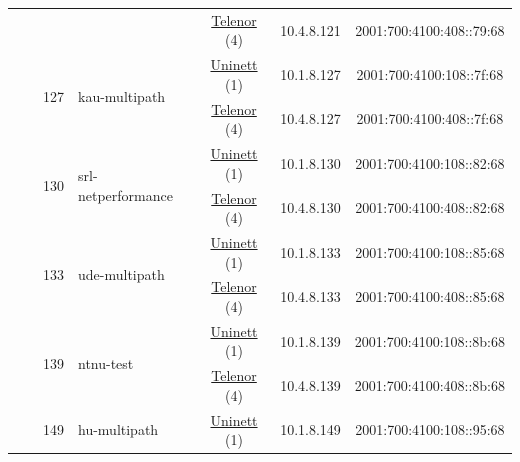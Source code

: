 \begin{small}
\begin{center}
\begin{longtable}{|c|c|c|c|c|c|c|c|}
  &  &  &  & \multicolumn{2}{|c|}{\tiny{\href{https://www.telenor.no}{Telenor} (4)}} & \tiny{10.4.8.121} & \tiny{2001:700:4100:408::79:68} \\* \cline{3-3}\cline{4-4}\cline{5-5}\cline{6-6}\cline{7-7}\cline{8-8}
  &  & \multirow{2}{*}{\tiny{127}} & \multicolumn{1}{|l|}{\multirow{2}{*}{\tiny{kau-multipath}}} & \multicolumn{2}{|c|}{\tiny{\href{https://www.uninett.no}{Uninett} (1)}} & \tiny{10.1.8.127} & \tiny{2001:700:4100:108::7f:68} \\* \cline{5-5}\cline{6-6}\cline{7-7}\cline{8-8}
  &  &  &  & \multicolumn{2}{|c|}{\tiny{\href{https://www.telenor.no}{Telenor} (4)}} & \tiny{10.4.8.127} & \tiny{2001:700:4100:408::7f:68} \\* \cline{3-3}\cline{4-4}\cline{5-5}\cline{6-6}\cline{7-7}\cline{8-8}
  &  & \multirow{2}{*}{\tiny{130}} & \multicolumn{1}{|l|}{\multirow{2}{*}{\tiny{srl-netperformance}}} & \multicolumn{2}{|c|}{\tiny{\href{https://www.uninett.no}{Uninett} (1)}} & \tiny{10.1.8.130} & \tiny{2001:700:4100:108::82:68} \\* \cline{5-5}\cline{6-6}\cline{7-7}\cline{8-8}
  &  &  &  & \multicolumn{2}{|c|}{\tiny{\href{https://www.telenor.no}{Telenor} (4)}} & \tiny{10.4.8.130} & \tiny{2001:700:4100:408::82:68} \\* \cline{3-3}\cline{4-4}\cline{5-5}\cline{6-6}\cline{7-7}\cline{8-8}
  &  & \multirow{2}{*}{\tiny{133}} & \multicolumn{1}{|l|}{\multirow{2}{*}{\tiny{ude-multipath}}} & \multicolumn{2}{|c|}{\tiny{\href{https://www.uninett.no}{Uninett} (1)}} & \tiny{10.1.8.133} & \tiny{2001:700:4100:108::85:68} \\* \cline{5-5}\cline{6-6}\cline{7-7}\cline{8-8}
  &  &  &  & \multicolumn{2}{|c|}{\tiny{\href{https://www.telenor.no}{Telenor} (4)}} & \tiny{10.4.8.133} & \tiny{2001:700:4100:408::85:68} \\* \cline{3-3}\cline{4-4}\cline{5-5}\cline{6-6}\cline{7-7}\cline{8-8}
  &  & \multirow{2}{*}{\tiny{139}} & \multicolumn{1}{|l|}{\multirow{2}{*}{\tiny{ntnu-test}}} & \multicolumn{2}{|c|}{\tiny{\href{https://www.uninett.no}{Uninett} (1)}} & \tiny{10.1.8.139} & \tiny{2001:700:4100:108::8b:68} \\* \cline{5-5}\cline{6-6}\cline{7-7}\cline{8-8}
  &  &  &  & \multicolumn{2}{|c|}{\tiny{\href{https://www.telenor.no}{Telenor} (4)}} & \tiny{10.4.8.139} & \tiny{2001:700:4100:408::8b:68} \\* \cline{3-3}\cline{4-4}\cline{5-5}\cline{6-6}\cline{7-7}\cline{8-8}
  &  & \multirow{2}{*}{\tiny{149}} & \multicolumn{1}{|l|}{\multirow{2}{*}{\tiny{hu-multipath}}} & \multicolumn{2}{|c|}{\tiny{\href{https://www.uninett.no}{Uninett} (1)}} & \tiny{10.1.8.149} & \tiny{2001:700:4100:108::95:68} \\* \cline{5-5}\cline{6-6}\cline{7-7}\cline{8-8}

\end{longtable}
\end{center}
\end{small}
